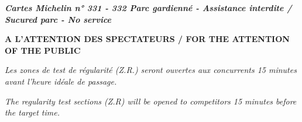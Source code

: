 \documentclass{article}%
\begin{document}
\begin{flushleft} \textit{\textbf{Cartes Michelin n° 331 - 332
                    Parc gardienné - Assistance interdite / Sucured parc - No service}} \end{flushleft}%
\begin{center} \textbf{A L’ATTENTION DES SPECTATEURS / FOR THE ATTENTION OF THE PUBLIC} \end{center}%
\begin{center} \textit{Les zones de test de régularité (Z.R.) seront ouvertes aux concurrents 15 minutes avant l’heure idéale de passage.} \end{center}%
\begin{center} \textit{The regularity test sections (Z.R) will be opened to competitors 15 minutes before the target time.} \end{center}%
\end{document}
